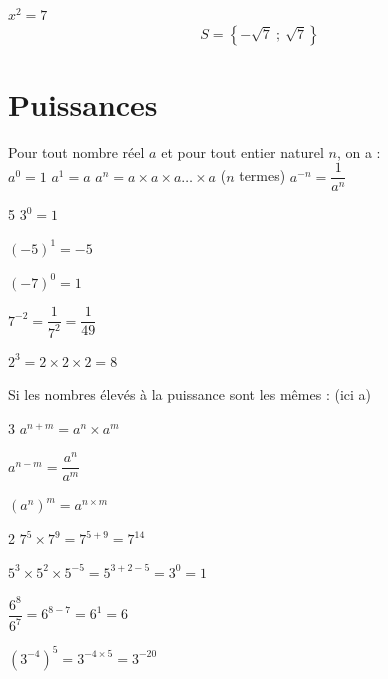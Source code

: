 \documentclass[11pt,a4paper]{book}
\begin{document}
\begin{bexemple} 
	$x^{2}=7$
	$$S=\left\{-\sqrt{7}\ ;\ \sqrt{7}\right\}$$  
\end{bexemple}

\section {Puissances}
\begin{bdefi} 
	Pour tout nombre réel $a$ et pour tout entier naturel $n$, on a : \\
	$a^{0}=1$  \quad \quad \quad \quad \quad $a^1=a$ \quad \quad \quad \quad \quad \quad $a^{n}=a \times a \times a \ldots \times a$ ($n$ termes) \quad \quad \quad \quad \quad $a^{-n}=\dfrac{1}{a^{n}}$
\end{bdefi}



\begin{bexemple}{}
	\begin{multicols}{5}
		$3^0=1$\par
		$(-5)^1=-5$ \par 
		$(-7)^0=1$ \par
		$7^{-2}=\dfrac{1}{7^2}=\dfrac{1}{49}$ \par
		$2^3=2\times 2\times 2=8$ \par 
	\end{multicols}
	
\end{bexemple}

\begin{proprietes}{Si les nombres élevés à la puissance sont les mêmes : (ici a)}
	\begin{multicols}{3}
		$a^{n+m}=a^{n} \times a^{m}$ \par
		$a^{n-m}=\dfrac{a^{n}}{a^{m}}$ \par
		${(a^{n})}^m=a^{n \times m}$
	\end{multicols}
\end{proprietes}

\begin{bexemple}{}
	\begin{multicols}{2}
		$7^{5} \times 7^{9}=7^{5+9}=7^{14}$ \par
		$5^{3} \times 5^{2} \times 5^{-5}=5^{3+2-5}=3^0=1$ \par
		$\dfrac{6^{8}}{6^{7}}=6^{8-7}=6^1=6$ \par
		$\left(3^{-4}\right)^{5}=3^{-4\times 5}=3^{-20}$ \par
	\end{multicols}
\end{bexemple}
\end{document}
